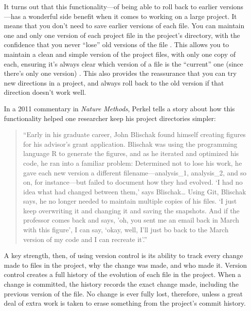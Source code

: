 \documentclass[]{tufte-book}
\begin{document}
It turns out that this functionality---of being able to roll back to earlier
versions---has a wonderful side benefit when it comes to working on a large
project. It means that you don't need to save earlier versions of each file. You
can maintain one and only one version of each project file in the project's
directory, with the confidence that you never ``lose'' old versions of the file
\citep{perkel2018git, blischak2016quick}. This allows you to maintain a clean and
simple version of the project files, with only one copy of each, ensuring it's
always clear which version of a file is the ``current'' one (since there's only
one version) \citep{klemens201421st}. This also provides the reassurance that you can
try new directions in a project, and always roll back to the old version if that
direction doesn't work well.

In a 2011 commentary in \emph{Nature Methods}, Perkel tells a story about how this
functionality helped one researcher keep his project directories simpler:

\begin{quote}
``Early in his graduate career, John Blischak found himself creating figures
for his advisor's grant application. Blischak was using the programming language
R to generate the figures, and as he iterated and optimized his code, he ran
into a familiar problem: Determined not to lose his work, he gave each new
version a different filename---analysis\_1, analysis\_2, and so on, for
instance---but failed to document how they had evolved. `I had no idea what had
changed between them,' says Blischak\ldots{} Using Git, Blischak says, he no longer
needed to maintain multiple copies of his files. `I just keep overwriting it and
changing it and saving the snapshots. And if the professor comes back and says,
'oh, you sent me an email back in March with this figure', I can say, `okay,
well, I'll just bo back to the March version of my code and I can recreate
it'.'' \citep{perkel2018git}
\end{quote}

A key strength, then, of using version control is its ability to track every
change made to files in the project, why the change was made, and who made it.
Version control creates a full history of the evolution of each file in the
project. When a change is committed, the history records the exact change made,
including the previous version of the file. No change is ever fully lost,
therefore, unless a great deal of extra work is taken to erase something from
the project's commit history.
\end{document}
